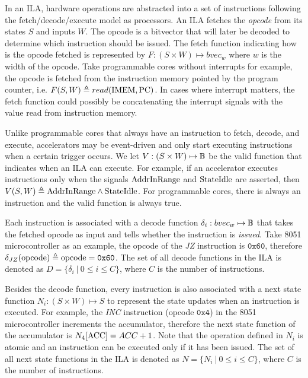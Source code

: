 \documentclass[letterpaper, 11 pt]{article}  %
\begin{document}
In an ILA, hardware operations are abstracted into a set of instructions 
following the fetch/decode/execute model as processors.
%
An ILA fetches the \textit{opcode} from its states $S$ and inputs $W$.
The opcode is a bitvector that will later be decoded to determine which 
instruction should be issued.
The fetch function indicating how is the opcode fetched is represented by 
$F : (S \times W) \mapsto bvec_w$ where $w$ is the width of the opcode.
Take programmable cores without interrupts for example, the opcode is fetched 
from the instruction memory pointed by the program counter, i.e. 
$F(S, W) \triangleq read( \mathrm{IMEM}, \mathrm{PC} )$.
In cases where interrupt matters, the fetch function could possibly be 
concatenating the interrupt signals with the value read from instruction memory.

Unlike programmable cores that always have an instruction to fetch, decode, and
execute, accelerators may be event-driven and only start executing instructions 
when a certain trigger occurs. 
We let $V : (S \times W) \mapsto \mathbb{B}$ be the valid function that indicates when 
an ILA can execute.
%
For example, if an accelerator executes instructions only when the signals 
$\mathrm{AddrInRange}$ and $\mathrm{StateIdle}$ are asserted, then 
$V(S, W) \triangleq \mathrm{AddrInRange} \wedge \mathrm{StateIdle}$.
For programmable cores, there is always an instruction and the valid function 
is always true.

Each instruction is associated with a decode function 
$\delta_i : bvec_w \mapsto \mathbb{B}$ that takes the fetched opcode as input and 
tells whether the instruction is \textit{issued}.
Take 8051 microcontroller as an example, the opcode of the \textit{JZ} 
instruction is $\texttt{0x60}$, therefore 
$\delta_{JZ} (\mathrm{opcode}) \triangleq \mathrm{opcode} = \texttt{0x60}$.
The set of all decode functions in the ILA is denoted as 
$D = \{ \delta_i ~|~ 0 \leq i \leq C \}$, where $C$ is the number of 
instructions.

Besides the decode function, every instruction is also associated with a 
next state function $N_i : (S \times W) \mapsto S$ to represent the state updates 
when an instruction is executed.
For example, the \textit{INC} instruction (opcode $\texttt{0x4}$) in the 8051 
microcontroller increments the accumulator, therefore the next state function 
of the accumulator is $N_4[\mathrm{ACC}] = ACC + 1$. 
Note that the operation defined in $N_i$ is atomic and an instruction can be 
executed only if it has been issued.
The set of all next state functions in the ILA is denoted as 
$N = \{ N_i ~|~ 0 \leq i \leq C \}$, where $C$ is the number of instructions.
\end{document}
